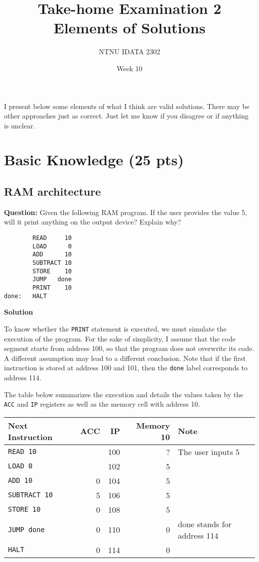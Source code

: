 \documentclass[11pt]{article}
\author{NTNU IDATA 2302}
\date{Week 10}
\title{Take-home Examination 2\\\medskip
\large Elements of Solutions}
\begin{document}
\maketitle
I present below some elements of what I think are valid
solutions. There may be other approaches just as correct. Just let me
know if you disagree or if anything is unclear.

\section{Basic Knowledge (25 pts)}
\label{sec:org765e563}

\subsection{RAM architecture}
\label{sec:org81846bd}

\textbf{Question:} Given the following RAM program. If the user provides
the value 5, will it print anything on the output device? Explain
why?

\begin{verbatim}
        READ     10
        LOAD      0
        ADD      10
        SUBTRACT 10
        STORE    10
        JUMP   done
        PRINT    10
done:   HALT   
\end{verbatim}

\textbf{Solution}

To know whether the \texttt{PRINT} statement is executed, we must
simulate the execution of the program. For the sake of simplicity,
I assume that the code segment starts from address 100, so that
the program does not overwrite its code. A different assumption
may lead to a different conclusion. Note that if the first
instruction is stored at address 100 and 101, then the \texttt{done}
label corresponds to address 114.

The table below summarizes the execution and details the values
taken by the \texttt{ACC} and \texttt{IP} registers as well as the memory cell
with address 10.
\begin{center}
\begin{tabular}{lrrrl}
\hline
Next Instruction &  ACC & IP & Memory 10 & Note\\
\hline
\texttt{READ 10} &  & 100 & ? & The user inputs 5\\
\texttt{LOAD 0} &  & 102 & 5 & \\
\texttt{ADD 10} & 0 & 104 & 5 & \\
\texttt{SUBTRACT 10} & 5 & 106 & 5 & \\
\texttt{STORE 10} & 0 & 108 & 5 & \\
\texttt{JUMP done} & 0 & 110 & 0 & done stands for address 114\\
\texttt{HALT} & 0 & 114 & 0 & \\
\hline
\end{tabular}
\end{center}
\end{document}
